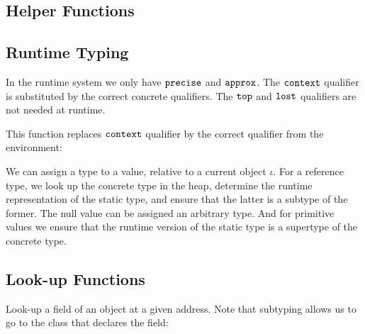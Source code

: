 \subsection{Helper Functions}

\vspace{0.5ex}
\ottdefncreation{}
\vspace{2.0ex}

\vspace{0.5ex}
\ottdefnupdate{}
\vspace{2.0ex}


\subsection{Runtime Typing}

In the runtime system we only have $ \texttt{\upshape{precise}\,\!} $ and $ \texttt{\upshape{approx}\,\!} $.
The $ \texttt{\upshape{context}\,\!} $ qualifier is substituted by the correct concrete
qualifiers.
The $ \texttt{\upshape{top}\,\!} $ and $ \texttt{\upshape{lost}\,\!} $ qualifiers are not needed at runtime.

This function replaces $ \texttt{\upshape{context}\,\!} $ qualifier by the correct
qualifier from the environment:

\vspace{0.5ex}
\ottdefnsTXXrT{}
\vspace{2.0ex}


We can assign a type to a value, relative to a current object
$\iota$.
For a reference type, we look up the concrete type in the heap,
determine the runtime representation of the static type, and ensure
that the latter is a subtype of the former.
The null value can be assigned an arbitrary type.
And for primitive values we ensure that the runtime version of the
static type is a supertype of the concrete type.

\vspace{0.5ex}
\ottdefnrttyping{}
\vspace{2.0ex}


\subsection{Look-up Functions}

Look-up a field of an object at a given address.
Note that subtyping allows us to go to the class that declares the
field:

\vspace{0.5ex}
\ottdefnrftype{}
\vspace{2.0ex}


